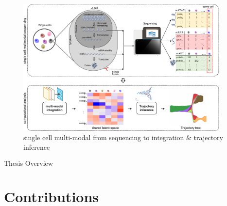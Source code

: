 \begin{figure}[!ht]
	\centering
	\includegraphics[width=0.95\textwidth]{multimodal_schematic/fig}
	\vspace{0.1cm}
	\caption[single cell multi-modal from sequencing to integration \& trajectory inference]{single cell multi-modal from sequencing to integration \& trajectory inference}
	\label{fig:sc_mulitmodal_sequencing_to_integration_ti}
\end{figure}



Thesis Overview
\section{Contributions}
\label{introduction:sec2.contributions}

